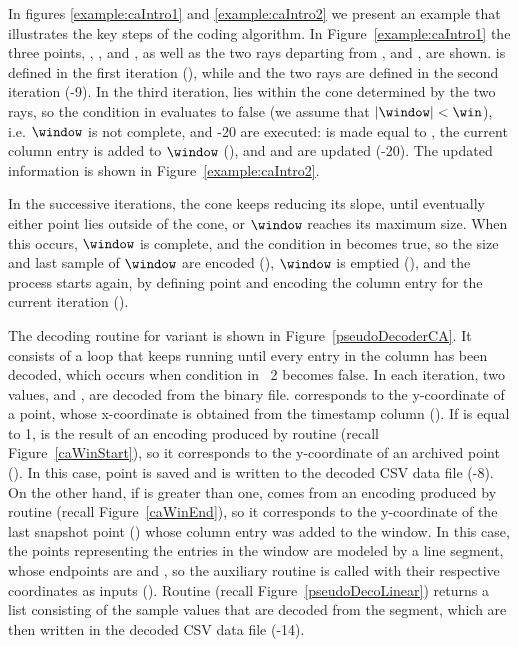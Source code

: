 In figures \ref{example:caIntro1} and \ref{example:caIntro2} we present an example that illustrates the key steps of the coding algorithm. In Figure~\ref{example:caIntro1} the three points, \archived, \snapshot, and \incoming, as well as the two rays departing from \archived, \smin and \smax, are shown. \archived is defined in the first iteration (), while \snapshot and the two rays are defined in the second iteration (-9). In the third iteration, \incoming lies within the cone determined by the two rays, so the condition in  evaluates to false (we assume that $|\window|<\win$), i.e. $\window$ is not complete, and -20 are executed: \snapshot is made equal to \incoming, the current column entry is added to $\window$ (), and \smin and \smax are updated (-20). The updated information is shown in Figure~\ref{example:caIntro2}. 


\vspace{+5pt}
\exampleCA


\clearpage


In the successive iterations, the cone keeps reducing its slope, until eventually either point \incoming lies outside of the cone, or $\window$ reaches its maximum size. When this occurs, $\window$ is complete, and the condition in  becomes true, so the size and last sample of $\window$ are encoded (), $\window$ is emptied (), and the process starts again, by defining point \archived and encoding the column entry for the current iteration ().


The decoding routine for variant \maskalgo is shown in Figure~\ref{pseudoDecoderCA}. It consists of a loop that keeps running until every entry in the column has been decoded, which occurs when condition in \Line~2 becomes false. In each iteration, two values, \sizee and , are decoded from the binary file.  corresponds to the y-coordinate of a point, whose x-coordinate is obtained from the timestamp column (). If \sizee is equal to 1,  is the result of an encoding produced by routine \CAWinStart (recall Figure~\ref{caWinStart}), so it corresponds to the y-coordinate of an archived point (\archived). In this case, point \archived is saved and  is written to the decoded CSV data file (-8). On the other hand, if \sizee is greater than one,  comes from an encoding produced by routine \CAWinEnd (recall Figure~\ref{caWinEnd}), so it corresponds to the y-coordinate of the last snapshot point (\snapshot) whose column entry was added to the window. In this case, the points representing the entries in the window are modeled by a line segment, whose endpoints are \archived and \snapshot, so the auxiliary routine \decodeSegment is called with their respective coordinates as inputs (). Routine \decodeSegment (recall Figure~\ref{pseudoDecoLinear}) returns a list consisting of the sample values that are decoded from the segment, which are then written in the decoded CSV data file (-14).


